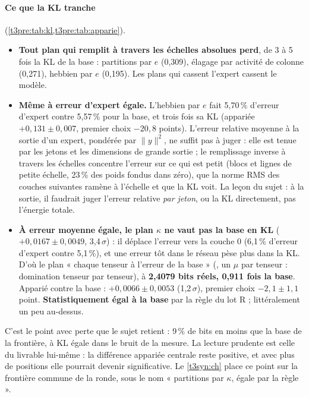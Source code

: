 \paragraph{Ce que la KL tranche} (\cref{t3pre:tab:kl,t3pre:tab:apparie}).
\begin{itemize}
\item \textbf{Tout plan qui remplit à travers les échelles absolues perd}, de 3 à 5 fois la KL de la base : partitions par $e$ (0,309), élagage par activité de colonne (0,271), hebbien par $e$ (0,195). Les plans qui cassent l'expert cassent le modèle.
\item \textbf{Même à erreur d'expert égale.} L'hebbien par $e$ fait 5,70\,\% d'erreur d'expert contre 5,57\,\% pour la base, et trois fois sa KL (appariée $+0{,}131 \pm 0{,}007$, premier choix $-20{,}8$ points). L'erreur relative moyenne à la sortie d'un expert, pondérée par $\|y\|^2$, ne suffit pas à juger : elle est tenue par les jetons et les dimensions de grande sortie ; le remplissage inverse à travers les échelles concentre l'erreur sur ce qui est petit (blocs et lignes de petite échelle, 23\,\% des poids fondus dans zéro), que la norme RMS des couches suivantes ramène à l'échelle et que la KL voit. La leçon du sujet : à la sortie, il faudrait juger l'erreur relative \emph{par jeton}, ou la KL directement, pas l'énergie totale.
\item \textbf{À erreur moyenne égale, le plan $\kappa$ ne vaut pas la base en KL} ($+0{,}0167 \pm 0{,}0049$, 3,4\,$\sigma$) : il déplace l'erreur vers la couche 0 (6,1\,\% d'erreur d'expert contre 5,1\,\%), et une erreur tôt dans le réseau pèse plus dans la KL. D'où le plan « chaque tenseur à l'erreur de la base » (, un $\mu$ par tenseur : domination tenseur par tenseur), à \textbf{2,4079 bits réels, 0,911 fois la base}. Apparié contre la base : $+0{,}0066 \pm 0{,}0053$ (1,2\,$\sigma$), premier choix $-2{,}1 \pm 1{,}1$ point. \textbf{Statistiquement égal à la base} par la règle du lot R ; littéralement un peu au-dessus.
\end{itemize}

C'est le point avec perte que le sujet retient : 9\,\% de bits en moins que la base de la frontière, à KL égale dans le bruit de la mesure. La lecture prudente est celle du livrable lui-même : la différence appariée centrale reste positive, et avec plus de positions elle pourrait devenir significative. Le \cref{t3syn:ch} place ce point sur la frontière commune de la ronde, sous le nom « partitions par $\kappa$, égale par la règle ».

